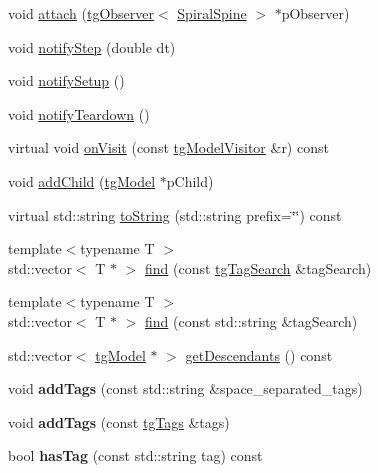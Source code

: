 \begin{DoxyCompactItemize}
\item 
void \hyperlink{classtg_subject_a56ecfd33a048c3a7f1a884318d9af548}{attach} (\hyperlink{classtg_observer}{tg\-Observer}$<$ \hyperlink{class_spiral_spine}{Spiral\-Spine} $>$ $\ast$p\-Observer)
\item 
void \hyperlink{classtg_subject_ad9640aa7fcc1e0b4ce8a913a4ce1ea42}{notify\-Step} (double dt)
\item 
void \hyperlink{classtg_subject_a80799e5d0c8512d3d05a55764790392b}{notify\-Setup} ()
\item 
void \hyperlink{classtg_subject_adf7a60dbb0faf0de5528f862e7953e63}{notify\-Teardown} ()
\item 
virtual void \hyperlink{classtg_model_aee6457e0fc54d5570b87bfc779f9b1c0}{on\-Visit} (const \hyperlink{classtg_model_visitor}{tg\-Model\-Visitor} \&r) const 
\item 
void \hyperlink{classtg_model_a292c17848b96caee32b2286e44c13f2f}{add\-Child} (\hyperlink{classtg_model}{tg\-Model} $\ast$p\-Child)
\item 
virtual std\-::string \hyperlink{classtg_model_af37b0c1a6d4060bfe0bb9b5038a17725}{to\-String} (std\-::string prefix=\char`\"{}\char`\"{}) const 
\item 
{\footnotesize template$<$typename T $>$ }\\std\-::vector$<$ T $\ast$ $>$ \hyperlink{classtg_model_ab75836fdfbd9200f165c3b28a19630c0}{find} (const \hyperlink{classtg_tag_search}{tg\-Tag\-Search} \&tag\-Search)
\item 
{\footnotesize template$<$typename T $>$ }\\std\-::vector$<$ T $\ast$ $>$ \hyperlink{classtg_model_aa40b5fb32f8941e04d537f4e6c6db35c}{find} (const std\-::string \&tag\-Search)
\item 
std\-::vector$<$ \hyperlink{classtg_model}{tg\-Model} $\ast$ $>$ \hyperlink{classtg_model_a2efa4321fa5c77b4ce23b01f6fd3a1c4}{get\-Descendants} () const 
\item 
\hypertarget{classtg_taggable_af0b8f1729653b0b90d2fecbd51163612}{void {\bfseries add\-Tags} (const std\-::string \&space\-\_\-separated\-\_\-tags)}\label{classtg_taggable_af0b8f1729653b0b90d2fecbd51163612}

\item 
\hypertarget{classtg_taggable_af28e3fe1a7e4eb28772dc006d575dd1f}{void {\bfseries add\-Tags} (const \hyperlink{classtg_tags}{tg\-Tags} \&tags)}\label{classtg_taggable_af28e3fe1a7e4eb28772dc006d575dd1f}

\item 
\hypertarget{classtg_taggable_ae31f65869c8887bfeb34a344902c4d5b}{bool {\bfseries has\-Tag} (const std\-::string tag) const }\label{classtg_taggable_ae31f65869c8887bfeb34a344902c4d5b}


\end{DoxyCompactItemize}
